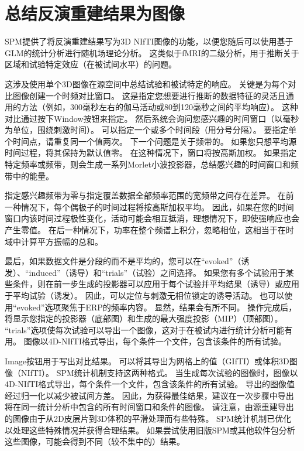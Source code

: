 \section{总结反演重建结果为图像}

SPM提供了将反演重建结果写为3D NIfTI图像的功能，以便您随后可以使用基于GLM的统计分析进行随机场理论分析。
这类似于fMRI的二级分析，用于推断关于区域和试验特定效应（在被试间水平）的问题。

这涉及使用单个3D图像在源空间中总结试验和被试特定的响应。
关键是为每个对比图像创建一个时频对比窗口。
这是指定您想要进行推断的数据特征的灵活且通用的方法（例如，300毫秒左右的伽马活动或80到120毫秒之间的平均响应）。
这种对比通过按下Window按钮来指定。
然后系统会询问您感兴趣的时间窗口（以毫秒为单位，围绕刺激时间）。
可以指定一个或多个时间段（用分号分隔）。
要指定单个时间点，请重复同一个值两次。
下一个问题是关于频带的。
如果您只想平均源时间过程，将其保持为默认值零。
在这种情况下，窗口将按高斯加权。
如果指定特定频率或频带，则会生成一系列Morlet小波投影器，总结感兴趣的时间窗口和频带中的能量。

指定感兴趣频带为零与指定覆盖数据全部频率范围的宽频带之间存在差异。
在前一种情况下，每个偶极子的时间过程将按高斯加权平均。
因此，如果在您的时间窗口内该时间过程极性变化，活动可能会相互抵消，理想情况下，即使强响应也会产生零值。
在后一种情况下，功率在整个频谱上积分，忽略相位，这相当于在时域中计算平方振幅的总和。

最后，如果数据文件是分段的而不是平均的，您可以在“evoked”（诱发）、“induced”（诱导）和“trials”（试验）之间选择。
如果您有多个试验用于某些条件，则在前一步生成的投影器可以应用于每个试验并平均结果（诱导）或应用于平均试验（诱发）。
因此，可以定位与刺激无相位锁定的诱导活动。
也可以使用“evoked”选项聚焦于ERP的频率内容。
显然，结果会有所不同。
操作完成后，将显示您指定的投影器（底部图）和生成的最大强度投影（MIP）（顶部图）。
“trials”选项使每次试验可以导出一个图像，这对于在被试内进行统计分析可能有用。
图像以4D-NIfTI格式导出，每个条件一个文件，包含该条件的所有试验。

Image按钮用于写出对比结果。
可以将其导出为网格上的值（GIfTI）或体积3D图像（NIfTI）。
SPM统计机制支持这两种格式。
当生成每次试验的图像时，图像以4D-NIfTI格式导出，每个条件一个文件，包含该条件的所有试验。
导出的图像值经过归一化以减少被试间方差。
因此，为获得最佳结果，建议在一次步骤中导出将在同一统计分析中包含的所有时间窗口和条件的图像。
请注意，由源重建导出的图像由于从2D皮层片到3D体积的平滑处理而有些特殊。
SPM统计机制已优化以处理这些特殊情况并获得合理结果。
如果尝试使用旧版SPM或其他软件包分析这些图像，可能会得到不同（较不集中的）结果。


